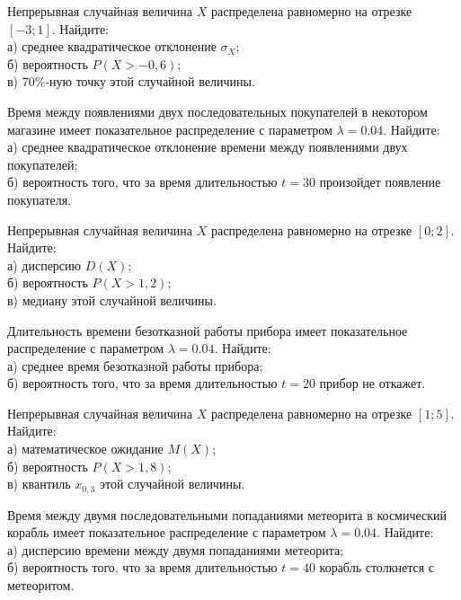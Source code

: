 \vfill

\newpage\setcounter{zad}{0}

\z Непрерывная случайная величина $X$ распределена равномерно на отрезке $[-3; 1]$. Найдите: \\ \quad а) среднее квадратическое отклонение $\sigma_X$; \\ \quad б) вероятность $P(X>-0{,}6)$; \\ \quad в) $70\%$-ную точку этой случайной величины.


\vfill

\z Время между появлениями двух последовательных покупателей в некотором магазине имеет показательное распределение с параметром $\lambda = 0.04$. Найдите: \\ \quad а) среднее квадратическое отклонение времени между появлениями двух покупателей; \\ \quad б) вероятность того, что за время длительностью $t = 30$  произойдет появление покупателя.
 

\vfill

\newpage\setcounter{zad}{0}

\z Непрерывная случайная величина $X$ распределена равномерно на отрезке $[0; 2]$. Найдите: \\ \quad а) дисперсию $D(X)$; \\ \quad б) вероятность $P(X>1{,}2)$; \\ \quad в) медиану этой случайной величины.


\vfill

\z Длительность времени безотказной работы прибора имеет показательное распределение с параметром $\lambda = 0.04$. Найдите: \\ \quad а) среднее время безотказной работы прибора; \\ \quad б) вероятность того, что за время длительностью $t = 20$ прибор не откажет.
 

\vfill

\newpage\setcounter{zad}{0}

\z Непрерывная случайная величина $X$ распределена равномерно на отрезке $[1; 5]$. Найдите: \\ \quad а) математическое ожидание $M(X)$; \\ \quad б) вероятность $P(X>1{,}8)$; \\ \quad в) квантиль $x_{0{,}3}$ этой случайной величины.


\vfill

\z Время между двумя последовательными попаданиями метеорита в космический корабль имеет показательное распределение с параметром $\lambda = 0.04$. Найдите: \\ \quad а) дисперсию времени между двумя попаданиями метеорита; \\ \quad б) вероятность того, что за время длительностью $t = 40$ корабль  столкнется с метеоритом.
 

